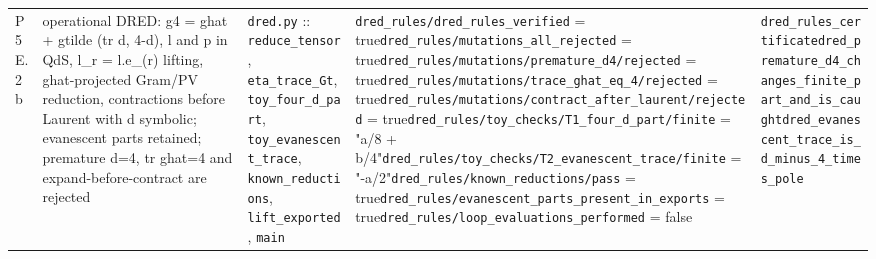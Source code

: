 {\begin{longtable}{@{}p{0.9cm}p{4.1cm}p{3.5cm}p{5.0cm}p{3.0cm}@{}}
P5E.2b & operational DRED: g4 = ghat + gtilde (tr d, 4-d), l and p in QdS, l\_r = l.e\_(r) lifting, ghat-projected Gram/PV reduction, contractions before Laurent with d symbolic; evanescent parts retained; premature d=4, tr ghat=4 and expand-before-contract are rejected & \texttt{dred.\allowbreak{}py} :: \texttt{reduce\_\allowbreak{}tensor}, \texttt{eta\_\allowbreak{}trace\_\allowbreak{}Gt}, \texttt{toy\_\allowbreak{}four\_\allowbreak{}d\_\allowbreak{}part}, \texttt{toy\_\allowbreak{}evanescent\_\allowbreak{}trace}, \texttt{known\_\allowbreak{}reductions}, \texttt{lift\_\allowbreak{}exported}, \texttt{main} & \texttt{\allowbreak{}dred\_\allowbreak{}rules/\allowbreak{}dred\_\allowbreak{}rules\_\allowbreak{}verified} = true\newline \texttt{\allowbreak{}dred\_\allowbreak{}rules/\allowbreak{}mutations\_\allowbreak{}all\_\allowbreak{}rejected} = true\newline \texttt{\allowbreak{}dred\_\allowbreak{}rules/\allowbreak{}mutations/\allowbreak{}premature\_\allowbreak{}d4/\allowbreak{}rejected} = true\newline \texttt{\allowbreak{}dred\_\allowbreak{}rules/\allowbreak{}mutations/\allowbreak{}trace\_\allowbreak{}ghat\_\allowbreak{}eq\_\allowbreak{}4/\allowbreak{}rejected} = true\newline \texttt{\allowbreak{}dred\_\allowbreak{}rules/\allowbreak{}mutations/\allowbreak{}contract\_\allowbreak{}after\_\allowbreak{}laurent/\allowbreak{}rejected} = true\newline \texttt{\allowbreak{}dred\_\allowbreak{}rules/\allowbreak{}toy\_\allowbreak{}checks/\allowbreak{}T1\_\allowbreak{}four\_\allowbreak{}d\_\allowbreak{}part/\allowbreak{}finite} = "a/\allowbreak{}8 + b/\allowbreak{}4"\newline \texttt{\allowbreak{}dred\_\allowbreak{}rules/\allowbreak{}toy\_\allowbreak{}checks/\allowbreak{}T2\_\allowbreak{}evanescent\_\allowbreak{}trace/\allowbreak{}finite} = "-a/\allowbreak{}2"\newline \texttt{\allowbreak{}dred\_\allowbreak{}rules/\allowbreak{}known\_\allowbreak{}reductions/\allowbreak{}pass} = true\newline \texttt{\allowbreak{}dred\_\allowbreak{}rules/\allowbreak{}evanescent\_\allowbreak{}parts\_\allowbreak{}present\_\allowbreak{}in\_\allowbreak{}exports} = true\newline \texttt{\allowbreak{}dred\_\allowbreak{}rules/\allowbreak{}loop\_\allowbreak{}evaluations\_\allowbreak{}performed} = false & \texttt{dred\_\allowbreak{}rules\_\allowbreak{}certificate}\newline \texttt{dred\_\allowbreak{}premature\_\allowbreak{}d4\_\allowbreak{}changes\_\allowbreak{}finite\_\allowbreak{}part\_\allowbreak{}and\_\allowbreak{}is\_\allowbreak{}caught}\newline \texttt{dred\_\allowbreak{}evanescent\_\allowbreak{}trace\_\allowbreak{}is\_\allowbreak{}d\_\allowbreak{}minus\_\allowbreak{}4\_\allowbreak{}times\_\allowbreak{}pole}\newline 
\end{longtable}}
